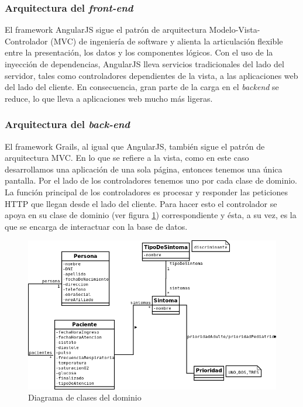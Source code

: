 \subsubsection{Arquitectura del \textit{front-end}}
El framework AngularJS sigue el patrón de arquitectura Modelo-Vista-Controlador (MVC) de ingeniería de software y alienta la articulación flexible entre la presentación, los datos y los componentes lógicos. Con el uso de la inyección de dependencias, AngularJS lleva servicios tradicionales del lado del servidor, tales como controladores dependientes de la vista, a las aplicaciones web del lado del cliente. En consecuencia, gran parte de la carga en el \textit{backend} se reduce, lo que lleva a aplicaciones web mucho más ligeras.

\subsubsection{Arquitectura del \textit{back-end}}
El framework Grails, al igual que AngularJS, también sigue el patrón de arquitectura MVC. En lo que se refiere a la vista, como en este caso desarrollamos una aplicación de una sola página, entonces tenemos una única pantalla. Por el lado de los controladores tenemos uno por cada clase de dominio. La función principal de los controladores es procesar y responder las peticiones HTTP que llegan desde el lado del cliente. Para hacer esto el controlador se apoya en su clase de dominio (ver figura \ref{fig:diagrama_de_clases}) correspondiente y ésta, a su vez, es la que se encarga de interactuar con la base de datos.

\begin{figure}
\centerline{\includegraphics[width=1.2\textwidth]{triage.png}}
\caption{Diagrama de clases del dominio}
\label{fig:diagrama_de_clases}
\end{figure}